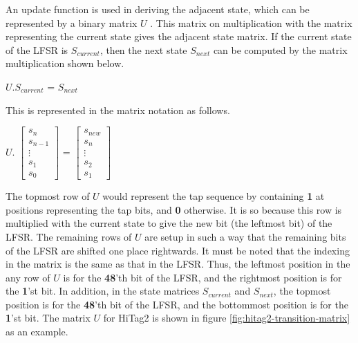 An update function is used in deriving the adjacent state, which can be represented by a binary matrix $U$ \cite{trappe2005icc}. This matrix on multiplication with the matrix representing the current state gives the adjacent state matrix. If the current state of the LFSR is $S_{current}$, then the next state $S_{next}$ can be computed by the matrix multiplication shown below.

\begin{center}
\large{$U . S_{current}$ = $S_{next}$}\\
\end{center}

This is represented in the matrix notation as follows.

\begin{center}
\large{
$U.$
$\begin{bmatrix}
s_{n} \\
s_{n-1} \\
\vdots \\
s_{1} \\
s_{0}
\end{bmatrix}$ = 
$\begin{bmatrix}
s_{new} \\
s_{n} \\
\vdots \\
s_{2} \\
s_{1}
\end{bmatrix}$}
\end{center}

The topmost row of $U$ would represent the tap sequence by containing \textbf{1} at positions representing the tap bits, and \textbf{0} otherwise. It is so because this row is multiplied with the current state to give the new bit (the leftmost bit) of the LFSR. The remaining rows of $U$ are setup in such a way that the remaining bits of the LFSR are shifted one place rightwards. It must be noted that the indexing in the matrix is the same as that in the LFSR. Thus, the leftmost position in the any row of $U$ is for the \textbf{48}'th bit of the LFSR, and the rightmost position is for the \textbf{1}'st bit. In addition, in the state matrices $S_{current}$ and $S_{next}$, the topmost position is for the \textbf{48}'th bit of the LFSR, and the bottommost position is for the \textbf{1}'st bit. The matrix $U$ for HiTag2 is shown in figure \ref{fig:hitag2-transition-matrix} as an example.

